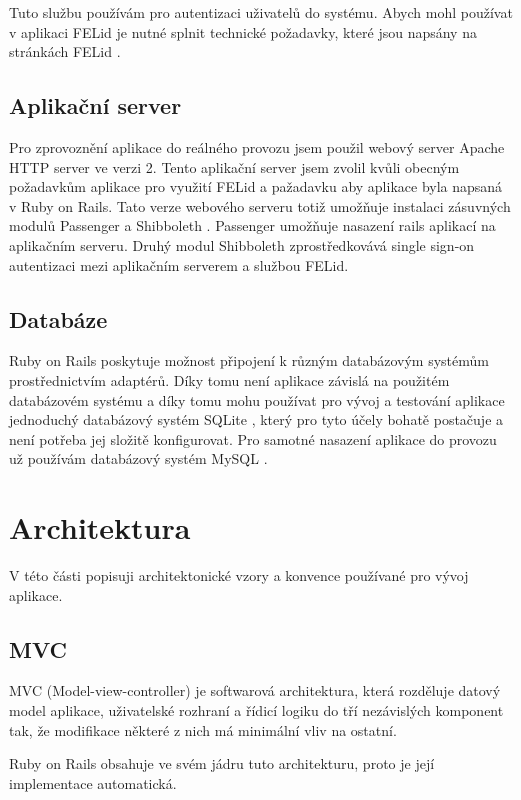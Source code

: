 Tuto službu používám pro autentizaci uživatelů do systému. Abych mohl používat v aplikaci FELid je nutné splnit technické požadavky, které jsou napsány na stránkách FELid \cite{felid_pozadavky}.

\subsection{Aplikační server}
\label{apache}
Pro zprovoznění aplikace do reálného provozu jsem použil webový server Apache HTTP server \cite{apache} ve verzi 2. Tento aplikační server jsem zvolil kvůli obecným požadavkům aplikace pro využití FELid a pažadavku aby aplikace byla napsaná v Ruby on Rails. Tato verze webového serveru totiž umožňuje instalaci zásuvných modulů Passenger \cite{passenger} a Shibboleth \cite{shibboleth}. Passenger umožňuje nasazení rails aplikací na aplikačním serveru. Druhý modul Shibboleth zprostředkovává single sign-on autentizaci mezi aplikačním serverem a službou FELid.

\subsection{Databáze}
Ruby on Rails poskytuje možnost připojení k různým databázovým systémům prostřednictvím adaptérů. Díky tomu není aplikace závislá na použitém databázovém systému a díky tomu mohu používat pro vývoj a testování aplikace jednoduchý databázový systém SQLite \cite{sqlite}, který pro tyto účely bohatě postačuje a není potřeba jej složitě konfigurovat. Pro samotné nasazení aplikace do provozu už používám databázový systém MySQL \cite{mysql}.

\section{Architektura}
V této části popisuji architektonické vzory a konvence používané pro vývoj aplikace. 

\subsection{MVC}
\label{mvc}
MVC (Model-view-controller) \cite{mvc} je softwarová architektura, která rozděluje datový model aplikace, uživatelské rozhraní a řídicí logiku do tří nezávislých komponent tak, že modifikace některé z nich má minimální vliv na ostatní. 

Ruby on Rails obsahuje ve svém jádru tuto architekturu, proto je její implementace automatická.

